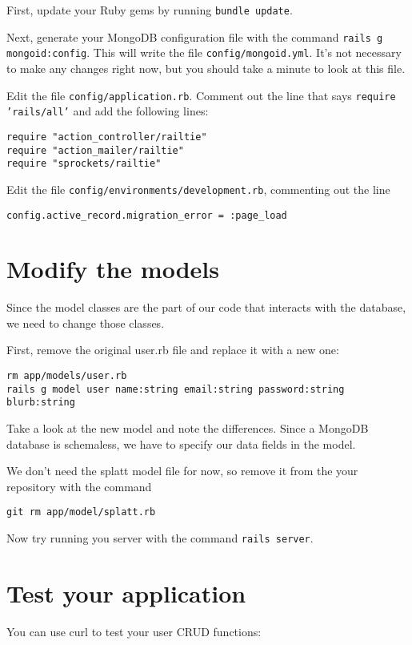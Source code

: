 \documentclass{article}
\begin{document}
First, update your Ruby gems by running \texttt{bundle update}.

Next, generate your MongoDB configuration file with the command \texttt{rails g mongoid:config}. This will 
write the file \texttt{config/mongoid.yml}.  It's not necessary to make any changes right now, but you should
take a minute to look at this file.

\newpage

Edit the file \texttt{config/application.rb}.  Comment out the line that says \texttt{require 'rails/all'} and
add the following lines:

\begin{verbatim}
require "action_controller/railtie"
require "action_mailer/railtie"
require "sprockets/railtie"
\end{verbatim}

Edit the file \texttt{config/environments/development.rb}, commenting out the line 

\texttt{config.active\_record.migration\_error = :page\_load}

\section{Modify the models}
Since the model classes are the part of our code that interacts with the database, we need to change
those classes.

First, remove the original user.rb file and replace it with a new one:

\begin{verbatim}
rm app/models/user.rb
rails g model user name:string email:string password:string blurb:string
\end{verbatim}

Take a look at the new model and note the differences.  Since a MongoDB database is schemaless, we
have to specify our data fields in the model.

We don't need the splatt model file for now, so remove it from the your repository with the command

\texttt{git rm app/model/splatt.rb}

Now try running you server with the command \texttt{rails server}.

\section{Test your application}
You can use curl to test your user CRUD functions:
\end{document}
